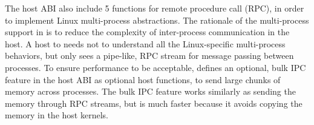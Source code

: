 


The host ABI also include 5 functions for 
remote procedure call (RPC),
in order to implement Linux multi-process abstractions.
The rationale of the multi-process support in \graphene{} is to reduce the complexity of inter-process communication in the host.
A host to \graphene{} needs not to understand all the Linux-specific multi-process behaviors,
but only sees a pipe-like, RPC stream for message passing between processes.
To ensure performance to be acceptable,
\graphene{} defines an optional, bulk IPC feature
in the host ABI
as optional host functions,
to send large chunks of memory across processes.
The bulk IPC feature works similarly as sending the memory through RPC streams,
but is much faster because it avoids copying the memory in the host kernels.





